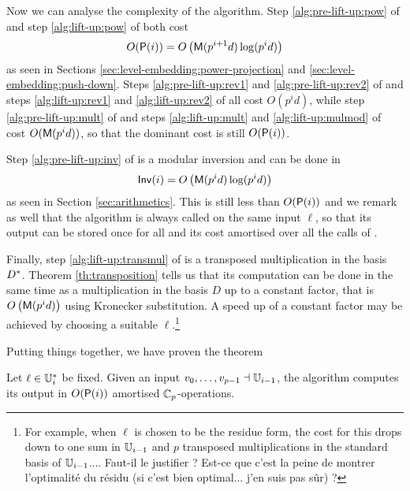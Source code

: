 Now we can analyse the complexity of the algorithm. Step
\ref{alg:pre-lift-up:pow} of  and step
\ref{alg:lift-up:pow} of  both cost
\[O(\mathrm{\sf P}(i)) = O\left(\mathrm{\sf M}(p^{i+1}d)\log(p^id)\right)\]
as seen in Sections \ref{sec:level-embedding:power-projection} and
\ref{sec:level-embedding:push-down}. Steps \ref{alg:pre-lift-up:rev1}
and \ref{alg:pre-lift-up:rev2} of  and steps
\ref{alg:lift-up:rev1} and \ref{alg:lift-up:rev2} of  all
cost $O(p^id)$, while step \ref{alg:pre-lift-up:mult} of
 and steps \ref{alg:lift-up:mult} and
\ref{alg:lift-up:mulmod} of  cost $O(\mathrm{\sf M}(p^id))$, so
that the dominant cost is still $O(\mathrm{\sf P}(i))$.

Step \ref{alg:pre-lift-up:inv} of  is a modular
inversion and can be done in
\[\mathrm{\sf Inv}(i) = O\left(\mathrm{\sf M}(p^id)\log(p^id)\right) \]
as seen in Section \ref{sec:arithmetics}. This is still less than
$O(\mathrm{\sf P}(i))$ and we remark as well that the algorithm
 is always called on the same input $\ell$, so that
its output can be stored once for all and its cost amortised over all
the calls of .

Finally, step \ref{alg:lift-up:transmul} of  is a
transposed multiplication in the basis $D^\ast$. Theorem
\ref{th:transposition} tells us that its computation can be done in
the same time as a multiplication in the basis $D$ up to a constant
factor, that is $O\left(\mathrm{\sf M}(p^id)\right)$ using Kronecker
substitution. A speed up of a constant factor may be achieved by
choosing a suitable $\ell$.\footnote{For example, when $\ell$ is
  chosen to be the residue form, the cost for this drops down to one
  sum in $\mathbb{U}_{i-1}$ and $p$ transposed multiplications in the standard
  basis of $\mathbb{U}_{i-1}$.... Faut-il le justifier ? Est-ce que c'est la
  peine de montrer l'optimalité du résidu (si c'est bien
  optimal... j'en suis pas sûr) ?}

Putting things together, we have proven the theorem
\begin{theorem}
  Let $\ell\in\mathbb{U}_i^\ast$ be fixed. Given an input
  $v_0,\ldots,v_{p-1}\dashv\mathbb{U}_{i-1}$, the algorithm 
  computes its output in $O(\mathrm{\sf P}(i))$ amortised $\mathbb{C}_p$-operations.
\end{theorem}



%

